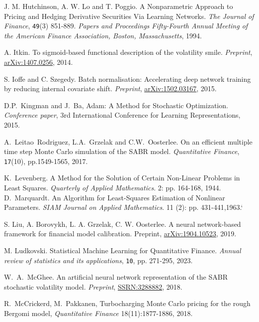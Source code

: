\documentclass{article}
\theoremstyle{remark}
\begin{document}
\begin{thebibliography}{99}
J. M. Hutchinson, A. W. Lo and T. Poggio.
A Nonparametric Approach to Pricing and Hedging Derivative Securities Via Learning Networks.
\textit{The Journal of Finance}, {\tt 49}(3) 851-889. \textit{Papers and Proceedings Fifty-Fourth Annual Meeting of the American Finance Association, Boston, Massachusetts}, 1994.

 A. Itkin.
To sigmoid-based functional description of the volatility smile.
\textit{Preprint}, \href{https://arxiv.org/pdf/1407.0256.pdf}{arXiv:1407.0256}, 2014. 

S. Ioffe and C. Szegedy.
Batch normalisation: Accelerating deep network training by reducing internal covariate shift. \textit{Preprint}, \href{https://arxiv.org/abs/1502.03167}{arXiv:1502.03167}, 2015.

 D.P.~Kingman and J.~Ba, Adam: A Method for Stochastic Optimization. \textit{Conference paper}, 3rd International Conference for Learning Representations, 2015.

 A.~Leitao~Rodriguez, L.A.~Grzelak and C.W.~Oosterlee. On an efficient multiple time step Monte Carlo simulation of the SABR model. \textit{Quantitative Finance}, {\tt 17}(10), pp.1549-1565, 2017.

 K.~Levenberg. A Method for the Solution of Certain Non-Linear Problems in Least Squares. \textit{Quarterly of Applied Mathematics}. 2: pp. 164-168, 1944.
 D.~Marquardt. An Algorithm for Least-Squares Estimation of Nonlinear Parameters. \textit{SIAM Journal on Applied Mathematics}. 11 (2): pp. 431-441,1963.`

 S. Liu, A. Borovykh, L. A. Grzelak, C. W. Oosterlee.
A neural network-based framework for financial model calibration.
Preprint, \href{https://arxiv.org/abs/1904.10523}{arXiv:1904.10523}, 2019.

 M. Ludkovski.
Statistical Machine Learning for Quantitative Finance.
\textit{Annual review of statistics and its applications}, {\tt 10}, pp. 271-295, 2023.

W.~A.~McGhee. An artificial neural network representation of the SABR stochastic volatility model. \textit{Preprint}, \href{https://ssrn.com/abstract=3288882}{SSRN:3288882}, 2018.

 R.~McCrickerd, M.~Pakkanen, Turbocharging Monte Carlo pricing for the rough Bergomi model, \textit{Quantitative Finance} 18(11):1877-1886, 2018.


\end{thebibliography}
\end{document}
